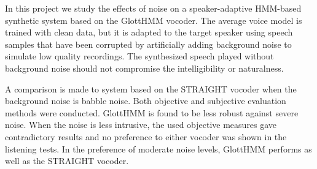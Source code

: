 \begin{abstractpage}[english]
In this project we study the effects of noise on a speaker-adaptive HMM-based synthetic system based on the GlottHMM vocoder.
%
The average voice model is trained with clean data, but it is adapted to the target speaker using speech samples that have been corrupted by artificially adding background noise to simulate low quality recordings. 
%
The synthesized speech played without background noise should not compromise the intelligibility or naturalness.

A comparison is made to system based on the STRAIGHT vocoder when the background noise is babble noise.
%
Both objective and subjective evaluation methods were conducted.
%
GlottHMM is found to be less robust against severe noise.
%
When the noise is less intrusive, the used objective measures gave contradictory results and no preference to either vocoder was shown in the listening tests.
%
In the preference of moderate noise levels, GlottHMM performs as well as the STRAIGHT vocoder. 
\end{abstractpage}